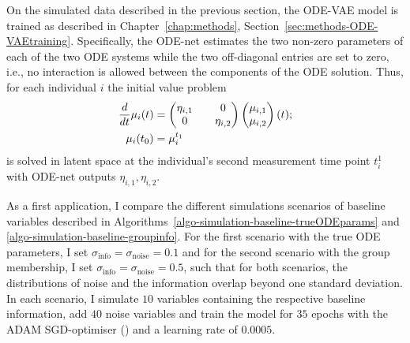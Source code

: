 On the simulated data described in the previous section, the ODE-VAE model is trained as described in Chapter~\ref{chap:methods}, Section~\ref{sec:methods-ODE-VAEtraining}. Specifically, the ODE-net estimates the two non-zero parameters of each of the two ODE systems while the two off-diagonal entries are set to zero, i.e., no interaction is allowed between the components of the ODE solution. Thus, for each individual $i$ the initial value problem 
\begin{equation*}
\begin{split}
	\frac{d}{dt} \mu_i(t) &= \begin{pmatrix} \eta_{i,1} && 0 \\ 0 && \eta_{i,2}	\end{pmatrix} \begin{pmatrix} \mu_{i,1} \\ \mu_{i,2}	\end{pmatrix} (t); \\
	\mu_i(t_0) &= \mu_i^{t_1}
\end{split}
\end{equation*}
is solved in latent space at the individual's second measurement time point $t_i^1$ with ODE-net outputs $\eta_{i,1}, \eta_{i,2}$. 

As a first application, I compare the different simulations scenarios of baseline variables described in Algorithms~\ref{algo-simulation-baseline-trueODEparams} and \ref{algo-simulation-baseline-groupinfo}. For the first scenario with the true ODE parameters, I set $\sigma_{\mathrm{info}} = \sigma_{\mathrm{noise}} = 0.1$ and for the second scenario with the group membership, I set $\sigma_{\mathrm{info}} = \sigma_{\mathrm{noise}} = 0.5$, such that for both scenarios, the distributions of noise and the information overlap beyond one standard deviation. In each scenario, I simulate $10$ variables containing the respective baseline information, add $40$ noise variables and train the model for $35$ epochs with the ADAM SGD-optimiser (\cite{Kingma2015}) and a learning rate of $0.0005$. 

